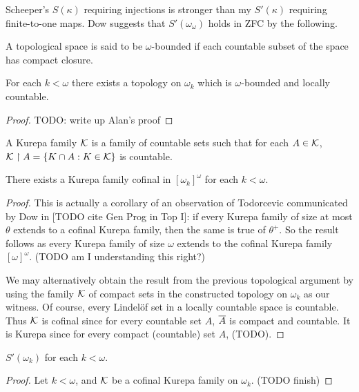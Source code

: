 \documentclass[11pt]{article}
\begin{document}
  \begin{remark}
    Scheeper's \(S(\kappa)\) requiring injections is stronger than my
    \(S'(\kappa)\) requiring finite-to-one maps. Dow suggests that
    \(S'(\omega_\omega)\) holds in ZFC by the following.
  \end{remark}

  \begin{definition}
    A topological space is said to be \(\omega\)-bounded if each countable
    subset of the space has compact closure.
  \end{definition}

  \begin{theorem}
    For each \(k<\omega\) there exists a topology on \(\omega_k\) which
    is \(\omega\)-bounded and locally countable.
  \end{theorem}

  \begin{proof}
    TODO: write up Alan's proof
  \end{proof}

  \begin{definition}
    A Kurepa family \(\mathcal{K}\)
    is a family of countable sets such that for each \(A\in\mathcal{K}\),
    \(\mathcal{K}\restriction A=\{K\cap A:K\in\mathcal{K}\}\) is countable.
  \end{definition}

  \begin{corollary}
    There exists a Kurepa family cofinal in \([\omega_k]^\omega\)
    for each \(k<\omega\).
  \end{corollary}

  \begin{proof}
    This is actually a corollary of an observation of Todorcevic communicated
    by Dow in [TODO cite Gen Prog in Top I]:
    if every Kurepa family of size at most \(\theta\)
    extends to a cofinal Kurepa family, then the same is true of \(\theta^+\).
    So the result follows as
    every Kurepa family of size \(\omega\) extends to
    the cofinal Kurepa family \([\omega]^\omega\). (TODO am I understanding
    this right?)

    We may alternatively
    obtain the result from the previous topological argument by using the family
    \(\mathcal{K}\) of compact sets in the constructed topology on
    \(\omega_k\) as our witness. Of course, every Lindel\"of set in
    a locally countable space is countable. Thus \(\mathcal{K}\)
    is cofinal since for every countable set \(A\), \(\overline{A}\) is compact
    and countable.
    It is Kurepa since for every compact (countable) set \(A\), (TODO).
  \end{proof}

  \begin{theorem}
    \(S'(\omega_k)\) for each \(k<\omega\).
  \end{theorem}

  \begin{proof}
    Let \(k<\omega\), and \(\mathcal{K}\) be a cofinal Kurepa family on \(\omega_k\).
    (TODO finish)
  \end{proof}
\end{document}
